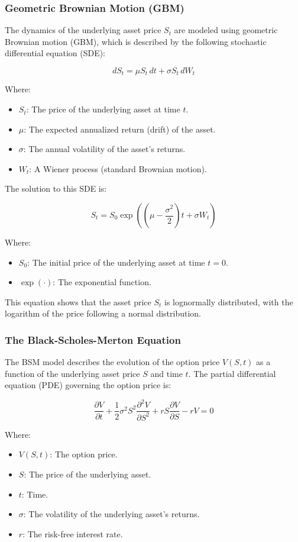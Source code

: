 \documentclass[11pt, oneside, a4paper, titlepage]{report}
\begin{document}
\subsubsection{Geometric Brownian Motion (GBM)}

The dynamics of the underlying asset price $S_t$ are modeled using geometric Brownian motion (GBM), which is described by the following stochastic differential equation (SDE):

\[
dS_t = \mu S_t \, dt + \sigma S_t \, dW_t
\]

Where:
\begin{itemize}
    \item $S_t$: The price of the underlying asset at time $t$.
    \item $\mu$: The expected annualized return (drift) of the asset.
    \item $\sigma$: The annual volatility of the asset's returns.
    \item $W_t$: A Wiener process (standard Brownian motion).
\end{itemize}

The solution to this SDE is:

\[
S_t = S_0 \exp\left(\left(\mu - \frac{\sigma^2}{2}\right)t + \sigma W_t\right)
\]

Where:
\begin{itemize}
    \item $S_0$: The initial price of the underlying asset at time $t = 0$.
    \item $\exp(\cdot)$: The exponential function.
\end{itemize}

This equation shows that the asset price $S_t$ is lognormally distributed, with the logarithm of the price following a normal distribution.

\subsubsection{The Black-Scholes-Merton Equation}

The BSM model describes the evolution of the option price \( V(S, t) \) as a function of the underlying asset price \( S \) and time \( t \). The partial differential equation (PDE) governing the option price is:

\[
\frac{\partial V}{\partial t} + \frac{1}{2} \sigma^2 S^2 \frac{\partial^2 V}{\partial S^2} + r S \frac{\partial V}{\partial S} - r V = 0
\]

Where:
\begin{itemize}
    \item \( V(S, t) \): The option price.
    \item \( S \): The price of the underlying asset.
    \item \( t \): Time.
    \item \( \sigma \): The volatility of the underlying asset's returns.
    \item \( r \): The risk-free interest rate.
\end{itemize}
\end{document}
